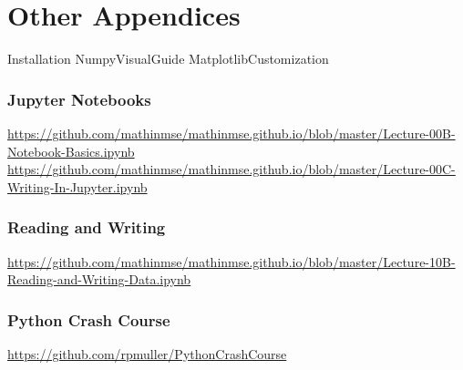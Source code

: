 \documentclass[letter,12pt]{book}
\renewcommand{\0}{\mathbf{0}}
\begin{document}

		 
\part{Other Appendices} %

	
{Installation} %
{NumpyVisualGuide} %
{MatplotlibCustomization} %

\section{Jupyter Notebooks}
\url{https://github.com/mathinmse/mathinmse.github.io/blob/master/Lecture-00B-Notebook-Basics.ipynb}
\url{https://github.com/mathinmse/mathinmse.github.io/blob/master/Lecture-00C-Writing-In-Jupyter.ipynb}

\section{Reading and Writing}
\url{https://github.com/mathinmse/mathinmse.github.io/blob/master/Lecture-10B-Reading-and-Writing-Data.ipynb}

\section{Python Crash Course}
\url{https://github.com/rpmuller/PythonCrashCourse}
\end{document}

